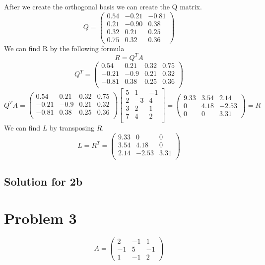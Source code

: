 \documentclass[a4paper,fleqn,12pt]{article}
\begin{document}
After we create the orthogonal basis we can create the Q matrix.
$$
Q = 
\begin{pmatrix} 
0.54 & -0.21 & -0.81 \\
0.21 & -0.90 & 0.38 \\
0.32 & 0.21 & 0.25 \\
0.75 & 0.32 & 0.36
\end{pmatrix}
$$
We can find R by the following formula 
$$
R = Q^T A
$$
$$
Q^T = 
\begin{pmatrix} 
0.54 & 0.21 & 0.32 & 0.75 \\
-0.21 & -0.9 & 0.21 & 0.32 \\
-0.81 & 0.38 & 0.25 & 0.36 \\
\end{pmatrix}
$$
$$
Q^TA =
 \begin{pmatrix} 
0.54 & 0.21 & 0.32 & 0.75 \\
-0.21 & -0.9 & 0.21 & 0.32 \\
-0.81 & 0.38 & 0.25 & 0.36 \\
\end{pmatrix} 
\begin{bmatrix}
	5 & 1 & -1 \\
	2 & -3 & 4 \\
	3 & 2 & 1 \\
	7 & 4 & 2 \\
\end{bmatrix} = 
\begin{pmatrix}
9.33 & 3.54 & 2.14 \\
0 & 4.18 & -2.53 \\
0 & 0 & 3.31
\end{pmatrix} = R
$$
We can find $L$ by transposing $R$.
$$
L = R^T = 
\begin{pmatrix}
9.33 & 0 & 0 \\
3.54 & 4.18 & 0 \\
2.14 & -2.53 & 3.31 \\
\end{pmatrix} 
$$

\newpage
\subsection{Solution for 2b}
\newpage

\section{Problem 3}
$$
A = 
\begin{pmatrix}
2 & -1 & 1 \\
-1 & 5 & -1 \\
1 & -1 & 2 
\end{pmatrix}
$$
\end{document}
